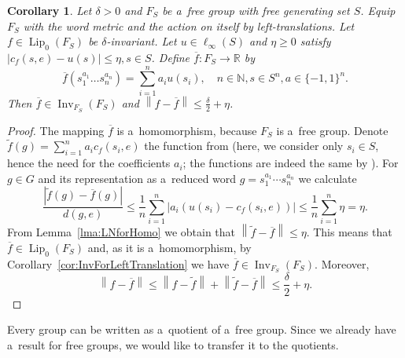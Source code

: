 \documentclass[11pt,a4paper]{amsart}
\newtheorem{corollary}[theorem]{Corollary}
\theoremstyle{definition}
\newcommand{\R}{\mathbb{R}}
\newcommand{\N}{\mathbb{N}}
\newcommand{\fTilde}{\widetilde{f}}
\newcommand{\fBar}{\overline{f}}
\newcommand{\abs}[1]{\left| #1 \right|}
\newcommand{\norm}[1]{\left\| #1 \right\|}
\newcommand{\Lipz}{\operatorname{Lip}_0}
\newcommand{\inv}{\operatorname{Inv}}
\begin{document}
	\begin{corollary} \label{cor:KYD_FreeAdj}
		Let $\delta > 0$ and $F_S$ be a~free group with free generating set $S$. Equip $F_S$ with the word metric and the action on itself by left-translations. Let $f \in \Lipz(F_S)$ be $\delta$-invariant. Let $u \in \ell_\infty(S)$ and $\eta \geq 0$ satisfy $\abs{c_f(s, e) - u(s)} \leq \eta, s \in S$. Define $\fBar: F_S \to \R$ by
		\begin{equation*}
			\fBar(s_1^{a_1} \dots s_n^{a_n}) = \sum_{i=1}^{n} a_i u(s_i), \quad n \in \N, s \in S^n, a \in \{-1,1\}^n.
		\end{equation*}
		Then $\fBar \in \inv_{F_S}(F_S)$ and $\norm{f - \fBar} \leq \frac{\delta}{2} + \eta$.
	\end{corollary}
	\begin{proof}
		The mapping $\fBar$ is a~homomorphism, because $F_S$ is a~free group. Denote $\fTilde(g) = \sum_{i=1}^n a_i c_f(s_i, e)$ the function from  (here, we consider only $s_i \in S$, hence the need for the coefficients $a_i$; the functions are indeed the same by ).
		For $g \in G$ and its representation as a~reduced word $g = s_1^{a_1} \cdots s_n^{a_n}$ we calculate
		\begin{equation*}
			\frac{\abs{\fTilde(g) - \fBar(g)}}{d(g, e)}
			\leq \frac{1}{n}\sum_{i=1}^n \abs{a_i (u(s_i) - c_f(s_i, e))}
			\leq \frac{1}{n} \sum_{i=1}^n \eta
			= \eta.
		\end{equation*}
		From Lemma~\ref{lma:LNforHomo} we obtain that $\norm{\fTilde - \fBar} \leq \eta$. This means that $\fBar \in \Lipz(F_S)$ and, as it is a~homomorphism, by Corollary~\ref{cor:InvForLeftTranslation} we have $\fBar \in \inv_{F_S}(F_S)$. Moreover, 
		\begin{equation*}
			\norm{f - \fBar} \leq \norm{f - \fTilde} + \norm{\fTilde - \fBar} \leq \frac{\delta}{2} + \eta.
		\end{equation*}
	\end{proof}
	
	Every group can be written as a~quotient of a~free group. Since we already have a~result for free groups, we would like to transfer it to the quotients.
	
\end{document}

